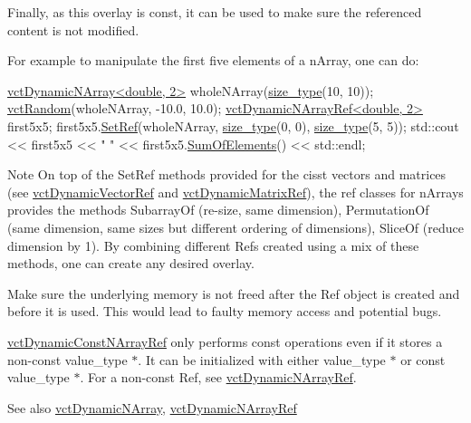 Finally, as this overlay is const, it can be used to make sure the referenced content is not modified.

For example to manipulate the first five elements of a n\+Array, one can do\+: 
\begin{DoxyCode}
\hyperlink{classvct_dynamic_n_array}{vctDynamicNArray<double, 2>} wholeNArray(\hyperlink{namespacevct_a3e2935e13aac4500965e00d30565775b}{size\_type}(10, 10));
\hyperlink{group__cisst_vector_ga0d25660a2dc6ef9c093f6f6b2804d2d0}{vctRandom}(wholeNArray, -10.0, 10.0);
\hyperlink{classvct_dynamic_n_array_ref}{vctDynamicNArrayRef<double, 2>} first5x5;
first5x5.\hyperlink{classvct_dynamic_n_array_ref_a395385ec68aafaea6e60af8bd330eb82}{SetRef}(wholeNArray, \hyperlink{namespacevct_a3e2935e13aac4500965e00d30565775b}{size\_type}(0, 0), \hyperlink{namespacevct_a3e2935e13aac4500965e00d30565775b}{size\_type}(5, 5));
std::cout << first5x5 << \textcolor{stringliteral}{" "} << first5x5.\hyperlink{classvct_dynamic_const_n_array_base_a57b568c584c363c2811e5c1020484a57}{SumOfElements}() << std::endl;
\end{DoxyCode}


\begin{DoxyNote}{Note}
On top of the Set\+Ref methods provided for the cisst vectors and matrices (see \hyperlink{classvct_dynamic_vector_ref}{vct\+Dynamic\+Vector\+Ref} and \hyperlink{classvct_dynamic_matrix_ref}{vct\+Dynamic\+Matrix\+Ref}), the ref classes for n\+Arrays provides the methods Subarray\+Of (re-\/size, same dimension), Permutation\+Of (same dimension, same sizes but different ordering of dimensions), Slice\+Of (reduce dimension by 1). By combining different Refs created using a mix of these methods, one can create any desired overlay.

Make sure the underlying memory is not freed after the Ref object is created and before it is used. This would lead to faulty memory access and potential bugs.

\hyperlink{classvct_dynamic_const_n_array_ref}{vct\+Dynamic\+Const\+N\+Array\+Ref} only performs const operations even if it stores a non-\/const {\ttfamily value\+\_\+type $\ast$}. It can be initialized with either {\ttfamily value\+\_\+type $\ast$} or {\ttfamily const value\+\_\+type $\ast$}. For a non-\/const Ref, see \hyperlink{classvct_dynamic_n_array_ref}{vct\+Dynamic\+N\+Array\+Ref}.
\end{DoxyNote}
\begin{DoxySeeAlso}{See also}
\hyperlink{classvct_dynamic_n_array}{vct\+Dynamic\+N\+Array}, \hyperlink{classvct_dynamic_n_array_ref}{vct\+Dynamic\+N\+Array\+Ref}
\end{DoxySeeAlso}

